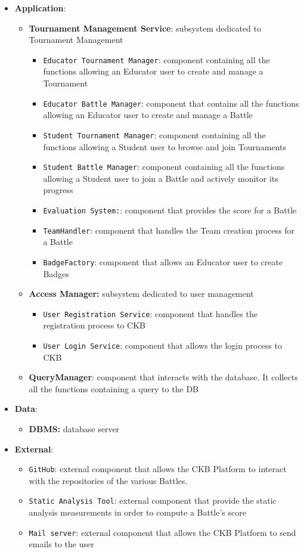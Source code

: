 \documentclass[a4paper, 11pt, titlepage]{article}
\begin{document}
\begin{itemize}
\item \textbf{Application}:
\begin{itemize}
  \item \textbf{Tournament Management Service}: subsystem dedicated to Tournament Management
    \begin{itemize}
      \item \texttt{Educator Tournament Manager}: component containing all the functions allowing an Educator user to create and manage a Tournament
      \item \texttt{Educator Battle Manager}: component that contains all the functions allowing an Educator user to create and manage a Battle
      \item \texttt{Student Tournament Manager}: component containing all the functions allowing a Student user to browse and join Tournaments
      \item \texttt{Student Battle Manager}: component containing all the functions allowing a Student user to join a Battle and actively monitor its progress
      \item \texttt{Evaluation System:}: component that provides the score for a Battle
      \item \texttt{TeamHandler}: component that handles the Team creation process for a Battle
      \item \texttt{BadgeFactory}: component that allows an Educator user to create Badges
    \end{itemize}
  \item \textbf{Access Manager:} subsystem dedicated to user management
    \begin{itemize}
      \item \texttt{User Registration Service}: component that handles the registration process to CKB
      \item \texttt{User Login Service}: component that allows the login process to CKB
    \end{itemize}
  \item \textbf{QueryManager}: component that interacts with the database. It collects all the functions containing a query to the DB
\end{itemize}

\item \textbf{Data}:
\begin{itemize}
  \item \textbf{DBMS:} database server
\end{itemize}

\item \textbf{External}:
  \begin{itemize}
    \item \texttt{GitHub}: external component that allows the CKB Platform to interact with the repositories of the various Battles.
    \item \texttt{Static Analysis Tool}: external component that provide the static analysis measurements in order to compute a Battle's score
    \item \texttt{Mail server}: external component that allows the CKB Platform to send emails to the user
  \end{itemize}
\end{itemize}
\end{document}
